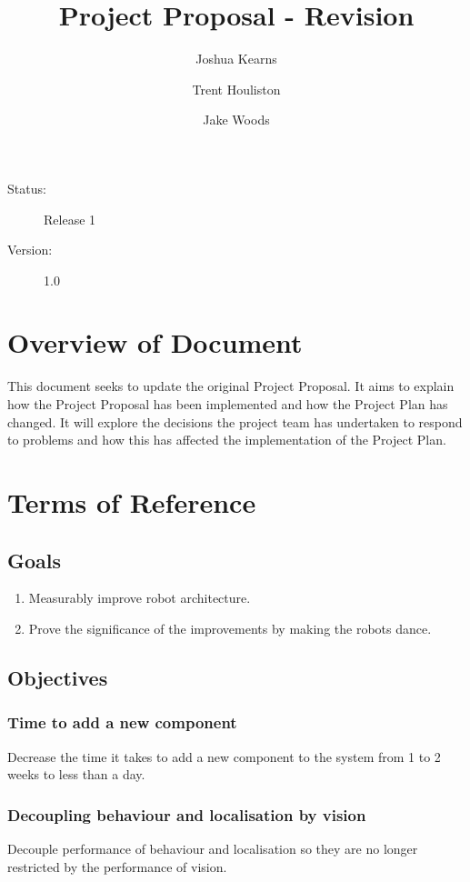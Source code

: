 \documentclass[english,12pt]{scrartcl}
\title{Project Proposal - Revision}
\author{Joshua Kearns \and Trent Houliston \and Jake Woods}
\begin{document}
	\maketitle
	\vfill
	{\large
		\begin{description}
			\item [Status:] Release 1
			\item [Version:] 1.0
		\end{description}}

	\clearpage
	\tableofcontents
	\clearpage

	\section{Overview of Document}
	This document seeks to update the original Project Proposal.
	It aims to explain how the Project Proposal has been implemented and how the Project Plan has changed.
	It will explore the decisions the project team has undertaken to respond to problems and how this has affected the implementation of the Project Plan.

	\section{Terms of Reference}
		\subsection {Goals}
			\begin{enumerate}
				\item Measurably improve robot architecture.
				\item Prove the significance of the improvements by making the robots dance. 
			\end{enumerate}
		\subsection {Objectives}
			\subsubsection{Time to add a new component}
				Decrease the time it takes to add a new component to the system from 1 to 2 weeks to less than a day.
			
			\subsubsection{Decoupling behaviour and localisation by vision}
				Decouple performance of behaviour and localisation so they are no longer restricted by the performance of vision.
			
\end{document}
